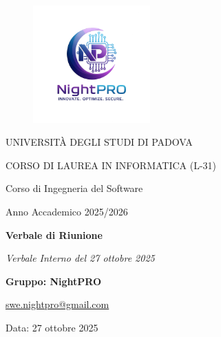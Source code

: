 \documentclass[a4paper, 11pt, oneside]{scrartcl} %
\begin{document}
\thispagestyle{empty}
\begin{titlepage}
    \centering
    
\begin{figure}
    \centering
    \includegraphics[width=0.4\textwidth]{logo.jpg}
\end{figure}

    \vfill
    
    {\small UNIVERSITÀ DEGLI STUDI DI PADOVA \par}
    {\small CORSO DI LAUREA IN INFORMATICA (L-31) \par}
    \vspace{0.5cm}
    {\large Corso di Ingegneria del Software \par}
    {\small Anno Accademico 2025/2026 \par}


    
    \vfill
    
    {\Huge \bfseries Verbale di Riunione \par}
    
    \vspace{1cm}
    
    {\Large \itshape Verbale Interno del 27 ottobre 2025 \par} 
    
    \vfill
    
    {\Large \bfseries Gruppo: NightPRO \par}
    \vspace{0.5cm}
    {\large \href{mailto:swe.nightpro@gmail.com}{swe.nightpro@gmail.com} \par}
    
    \vfill
  
    {\large Data: 27 ottobre 2025 \par}

\end{titlepage}
\end{document}
